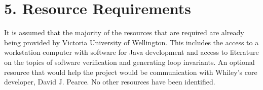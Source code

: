 \documentclass[11pt, a4paper, twoside, openright]{report}
\begin{document}

\section*{5. Resource Requirements}


It is assumed that the majority of the resources that are required are already being
provided by Victoria University of Wellington.
This includes the access to a workstation computer with software for Java development
and access to literature on the topics of software verification
and generating loop invariants.
An optional resource that would help the project would be communication
with Whiley's core developer, David J. Pearce.
No other resources have been identified.



\backmatter

%


\end{document}

